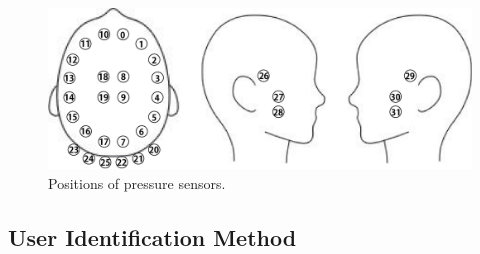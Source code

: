 \documentclass[sigchi,authordraft]{acmart}
\begin{document}
\begin{figure}[!t]
  \begin{center}
    \includegraphics[width=1\linewidth]{figure/position.eps}
  \end{center}
  \caption{Positions of pressure sensors.}
  \label{fig:position}
\end{figure}





\subsection{User Identification Method}

\end{document}
